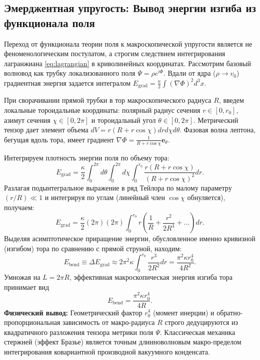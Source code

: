 \documentclass[11pt,a4paper]{article}
\begin{document}
\subsection{Эмерджентная упругость: Вывод энергии изгиба из функционала поля}
Переход от функционала теории поля к макроскопической упругости является не феноменологическим постулатом, а строгим следствием интегрирования лагранжиана \eqref{eq:lagrangian} в криволинейных координатах.
Рассмотрим базовый волновод как трубку локализованного поля $\Psi = \rho e^{i\Phi}$. Вдали от ядра ($\rho \to v_0$) градиентная энергия задается интегралом $E_{\text{grad}} = \frac{\kappa}{2} \int (\nabla \Phi)^2 d^3x$.

При сворачивании прямой трубки в тор макроскопического радиуса $R$, введем локальные тороидальные координаты: полярный радиус сечения $r \in [0, r_0]$, азимут сечения $\chi \in [0, 2\pi]$ и тороидальный угол $\theta \in [0, 2\pi]$. Метрический тензор дает элемент объема $dV = r(R + r\cos\chi) dr d\chi d\theta$.
Фазовая волна лептона, бегущая вдоль тора, имеет градиент $\nabla \Phi = \frac{1}{R + r\cos\chi} \mathbf{e}_\theta$.

Интегрируем плотность энергии поля по объему тора:
\begin{equation}
	E_{\text{grad}} = \frac{\kappa}{2} \int_0^{2\pi} d\theta \int_0^{2\pi} d\chi \int_0^{r_0} \frac{r(R + r\cos\chi)}{(R + r\cos\chi)^2} dr.
\end{equation}
Разлагая подынтегральное выражение в ряд Тейлора по малому параметру $(r/R) \ll 1$ и интегрируя по углам (линейный член $\cos\chi$ обнуляется), получаем:
\begin{equation}
	E_{\text{grad}} = \frac{\kappa}{2} (2\pi) (2\pi) \int_0^{r_0} r \left( \frac{1}{R} + \frac{r^2}{2R^3} + \dots \right) dr.
\end{equation}
Выделяя асимптотическое приращение энергии, обусловленное именно кривизной (изгибом) тора по сравнению с прямой струной, находим:
\begin{equation}
	E_{\text{bend}} \equiv \Delta E_{\text{grad}} \approx 2\pi^2 \kappa \int_0^{r_0} \frac{r^3}{2R^2} dr = \frac{\pi^2 \kappa r_0^4}{4 R^2}.
	\label{eq:field_to_mechanics}
\end{equation}
Умножая на $L = 2\pi R$, эффективная макроскопическая энергия изгиба тора принимает вид 
\begin{equation}
	E_{\text{bend}} = \frac{\pi^2 \kappa r_0^4}{4R}.
\end{equation}
\textbf{Физический вывод:} Геометрический фактор $r_0^4$ (момент инерции) и обратно-пропорциональная зависимость от макро-радиуса $R$ строго дедуцируются из квадратичного разложения тензора метрики поля $\Psi$. Классическая механика стержней (эффект Бразье) является точным длинноволновым макро-пределом интегрирования ковариантной производной вакуумного конденсата.
	
\end{document}
